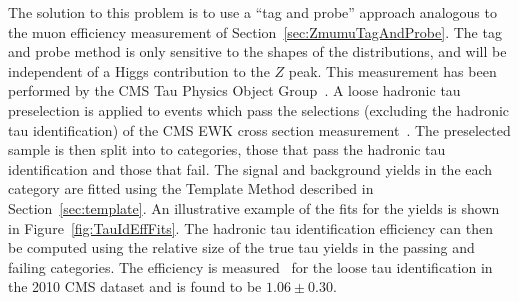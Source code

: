 The solution to this problem is to use a ``tag and probe'' approach analogous to
the muon efficiency measurement of Section~\ref{sec:ZmumuTagAndProbe}.  The tag
and probe method is only sensitive to the shapes of the distributions, and will
be independent of a Higgs contribution to the $Z$ peak.  This measurement has
been performed by the CMS Tau Physics Object Group~\cite{CMS-PAS-TAU-11-001}.  A
loose hadronic tau preselection is applied to events which pass the selections
(excluding the hadronic tau identification) of the CMS EWK \ZTT cross section
measurement~\cite{CMS-PAS-EWK-10-013}.  The preselected sample is then split
into to categories, those that pass the hadronic tau identification and those
that fail.  The signal and background yields in the each category are fitted
using the Template Method described in Section~\ref{sec:template}.  An
illustrative example of the fits for the yields is shown in
Figure~\ref{fig:TauIdEffFits}.  The hadronic tau identification efficiency can
then be computed using the relative size of the true tau yields in the passing
and failing categories.  The efficiency is measured~\cite{CMS-PAS-TAU-11-001}
for the loose \hpsTanc tau identification in the 2010 CMS dataset and is found
to be \mbox{$1.06 \pm 0.30$}. 
%
